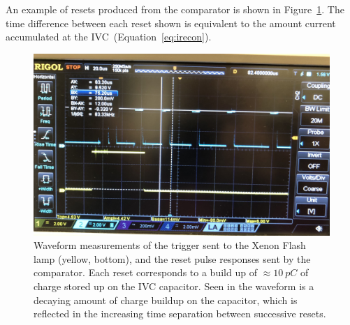 An example of resets produced from the comparator is shown in Figure~\ref{fig:saq_resets}.
The time difference between each reset shown is equivalent to the amount current accumulated at the IVC~(Equation~\ref{eq:irecon}).


\begin{figure}[]
\centering
\includegraphics[width=\textwidth]{images/saq_reset_pulse_gem_thickBoard.jpg}
\caption{Waveform measurements of the trigger sent to the Xenon Flash lamp (yellow, bottom), and the reset pulse responses sent by the comparator.
Each reset corresponds to a build up of $\approx 10~\unit{pC}$ of charge stored up on the IVC capacitor.
Seen in the waveform is a decaying amount of charge buildup on the capacitor, which is reflected in the increasing time separation between successive resets.
}
\label{fig:saq_resets}
\end{figure}

